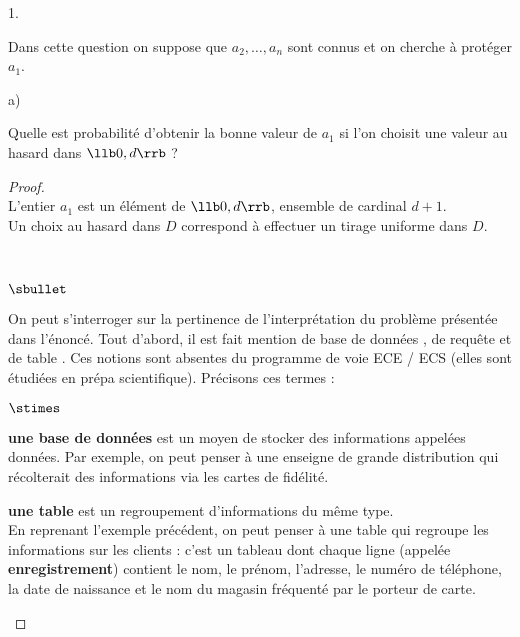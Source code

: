 \begin{noliste}{1.}
  \setlength{\itemsep}{4mm} %
  \setcounter{enumi}{11}
\item Dans cette question on suppose que $a_2,\ldots,a_n$ sont connus et
  on cherche à protéger $a_1$.
  \begin{noliste}{a)}
  \setlength{\itemsep}{2mm} %
  \item Quelle est probabilité d'obtenir la bonne valeur de $a_1$ si
    l'on choisit une valeur au hasard dans $\llb 0, d \rrb$ ?

    \begin{proof}~\\%
      L'entier $a_1$ est un élément de $\llb 0, d \rrb$, ensemble de
      cardinal $d+1$.\\
      Un choix au hasard dans $D$ correspond à effectuer un tirage
      uniforme dans $D$.%
      \begin{remark}~%
        \begin{noliste}{$\sbullet$}
        \item On peut s'interroger sur la pertinence de
          l'interprétation du problème présentée dans l'énoncé. Tout
          d'abord, il est fait mention de \og base de données \fg{},
          de \og requête \fg{} et de \og table \fg{}. Ces notions sont
          absentes du programme de voie ECE / ECS (elles sont étudiées
          en prépa scientifique). Précisons ces termes :
          \begin{noliste}{$\stimes$}
          \item {\bf une base de données} est un moyen de stocker des
            informations appelées données.
            Par exemple, on peut penser à une enseigne de grande
            distribution qui récolterait des informations via les
            cartes de fidélité.
          \item {\bf une table} est un regroupement d'informations du
            même type.\\
            En reprenant l'exemple précédent, on peut penser à une
            table qui regroupe les informations sur les clients : c'est 
	    un tableau dont chaque ligne (appelée {\bf enregistrement})
            contient le nom, le prénom, l'adresse, le
            numéro de téléphone, la date de naissance et le nom du
            magasin
            fréquenté par le porteur de carte.\\

\end{noliste}
\end{noliste}
\end{remark}
\end{proof}
\end{noliste}
\end{noliste}
